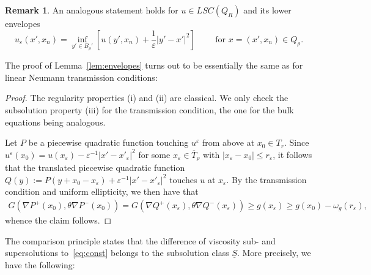 \documentclass[letter,11pt]{amsart}
\newcommand{\vep}{\varepsilon}
\newcommand{\lowers}{LSC}
\theoremstyle{definition}
\newtheorem{rem}[thm]{Remark}
\numberwithin{equation}{section}
\begin{document}
\begin{rem}
An analogous statement holds for $u \in \lowers(Q_R)$ and its lower envelopes
\[
u_{\vep}(x', x_n) 
= \inf_{y' \in B_\rho'}\left[u(y', x_n) + \frac{1}{\vep} |y' -x'|^2\right]
\qquad \text{ for } x= (x',x_n) \in Q_{\rho}.
\]
\end{rem}

\medskip

The proof of Lemma~\ref{lem:envelopes} turns out to be essentially the same as for linear Neumann transmission conditions:

\begin{proof}
The regularity properties (i) and (ii) are classical.
We only check the subsolution property (iii) for the transmission condition, the one for the bulk equations being analogous.

\medskip

Let $P$ be a piecewise quadratic function touching $u^{\vep}$ from above at $x_0 \in T_{r}$.
Since $u^{\vep}(x_0) = u(x_{\vep}) - \vep^{-1}|x' -x'_{\vep}|^2$ for some $x_{\vep} \in \overline{T}_{\rho}$ with $|x_{\vep} - x_{0}| \leq r_{\vep}$, it follows that the translated piecewise quadratic function $Q(y) := P(y + x_0-x_{\vep}) + \vep^{-1} |x' -x'_{\vep}|^2$ touches $u$ at $x_{\vep}$.
By the transmission condition and uniform ellipticity, we then have that
\[
\begin{split}
G(\nabla P^{+}(x_{0}),\theta \nabla P^{-}(x_{0})) = 
G(\nabla Q^{+}(x_{\vep}),\theta \nabla Q^{-}(x_{\vep})) \geq g(x_{\vep}) \geq g(x_0) - \omega_{g}(r_{\vep}),
\end{split}
\]
whence the claim follows.
\end{proof}

\medskip

The comparison principle states that the difference of viscosity sub- and supersolutions to~\eqref{eq:const} belongs to the subsolution class $\underline{S}$.
More precisely, we have the following:
\end{document}
